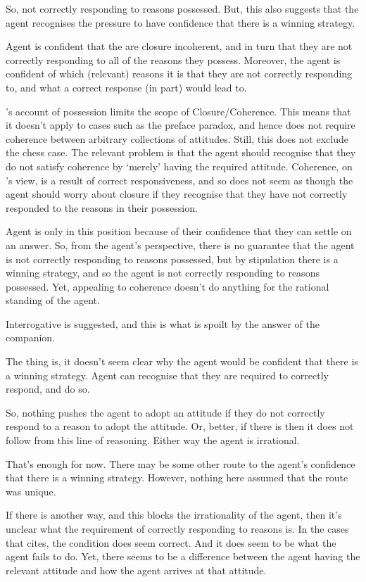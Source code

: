 \documentclass[10pt]{article}
\begin{document}
So, not correctly responding to reasons possessed.
But, this also suggests that the agent recognises the pressure to have confidence that there is a winning strategy.

Agent is confident that the are closure incoherent, and in turn that they are not correctly responding to all of the reasons they possess.
Moreover, the agent is confident of which (relevant) reasons it is that they are not correctly responding to, and what a correct response (in part) would lead to.

\citeauthor{Lord:2018aa}'s account of possession limits the scope of Closure/Coherence.
This means that it doesn't apply to cases such as the preface paradox, and hence does not require coherence between arbitrary collections of attitudes.
Still, this does not exclude the chess case.
The relevant problem is that the agent should recognise that they do not satisfy coherence by `merely' having the required attitude.
Coherence, on \citeauthor{Lord:2018aa}'s view, is a result of correct responsiveness, and so does not seem as though the agent should worry about closure if they recognise that they have not correctly responded to the reasons in their possession.



Agent is only in this position because of their confidence that they can settle on an answer.
So, from the agent's perspective, there is no guarantee that the agent is not correctly responding to reasons possessed, but by stipulation there is a winning strategy, and so the agent is not correctly responding to reasons possessed.
Yet, appealing to coherence doesn't do anything for the rational standing of the agent.

Interrogative is suggested, and this is what is spoilt by the answer of the companion.

The thing is, it doesn't seem clear why the agent would be confident that there is a winning strategy.
Agent can recognise that they are required to correctly respond, and do so.

So, nothing pushes the agent to adopt an attitude if they do not correctly respond to a reason to adopt the attitude.
Or, better, if there is then it does not follow from this line of reasoning.
Either way the agent is irrational.

That's enough for now.
There may be some other route to the agent's confidence that there is a winning strategy.
However, nothing here assumed that the route was unique.

If there is another way, and this blocks the irrationality of the agent, then it's unclear what the requirement of correctly responding to reasons is.
In the cases that \citeauthor{Lord:2018aa} cites, the condition does seem correct.
And it does seem to be what the agent fails to do.
Yet, there seems to be a difference between the agent having the relevant attitude and how the agent arrives at that attitude.
\end{document}

